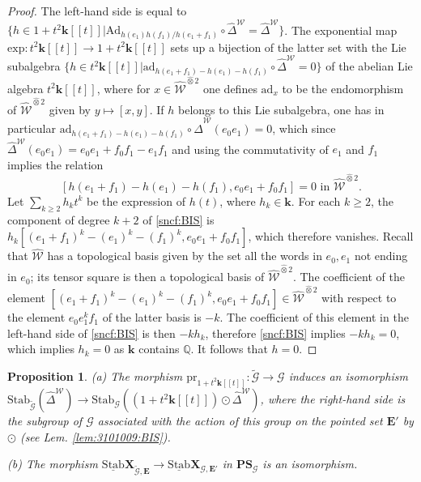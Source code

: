 \documentclass[10pt]{amsart}
\newtheorem{prop}[thm]{Proposition}
\numberwithin{equation}{subsection}
\begin{document}
\begin{proof} The left-hand side is equal to 
$\{h\in 1+t^2\mathbf k[[t]] | \mathrm{Ad}_{h(e_1)h(f_1)/h(e_1+f_1)} \circ\hat\Delta^{\mathcal W}
=\hat\Delta^{\mathcal W}\}$. The exponential map $\mathrm{exp} : t^2\mathbf k[[t]]\to 1+t^2\mathbf k[[t]]$ sets up a bijection of the latter set with the Lie subalgebra 
$\{h\in t^2\mathbf k[[t]] | \mathrm{ad}_{h(e_1+f_1)-h(e_1)-h(f_1)} \circ\hat\Delta^{\mathcal W}=0\}$ of the abelian Lie algebra $t^2\mathbf k[[t]]$, where for $x\in
\hat{\mathcal W}^{\hat\otimes2}$ one defines $\mathrm{ad}_x$ to be the endomorphism of $\hat{\mathcal W}^{\hat\otimes2}$ given by $y\mapsto [x,y]$. 
If $h$ belongs to this Lie subalgebra, one has in particular  $\mathrm{ad}_{h(e_1+f_1)-h(e_1)-h(f_1)} \circ\hat\Delta^{\mathcal W}(e_0e_1)=0$, which since 
$\hat\Delta^{\mathcal W}(e_0e_1)=e_0e_1+f_0f_1-e_1f_1$ and using the commutativity of $e_1$ and $f_1$ implies the relation 
\begin{equation}\label{sncf:BIS}
[h(e_1+f_1)-h(e_1)-h(f_1),e_0e_1+f_0f_1]=0\text{ in }\hat{\mathcal W}^{\hat\otimes 2}.
\end{equation} Let $\sum_{k\geq 2}h_kt^k$ be the expression of $h(t)$, where $h_k\in\mathbf k$. 
For each $k\geq2$, the component of degree $k+2$ of \eqref{sncf:BIS} is $h_k[(e_1+f_1)^k-(e_1)^k-(f_1)^k,e_0e_1+f_0f_1]$, which therefore vanishes. 
Recall that $\hat{\mathcal W}$ has a topological basis given by the set all the words in $e_0,e_1$ not ending in $e_0$; its tensor square is then a topological 
basis of $\hat{\mathcal W}^{\hat\otimes 2}$. The coefficient of the element $[(e_1+f_1)^k-(e_1)^k-(f_1)^k,e_0e_1+f_0f_1]\in 
\hat{\mathcal W}^{\hat\otimes 2}$ with respect to the element $e_0e_1^kf_1$ of the latter basis 
is $-k$. The coefficient of this element in the left-hand side of \eqref{sncf:BIS} is then $-kh_k$, therefore \eqref{sncf:BIS} implies $-kh_k=0$, which  
implies $h_k=0$ as $\mathbf k$ contains $\mathbb Q$. It follows that $h=0$.    
\end{proof}


\begin{prop}\label{prop:4:25:1110}
(a) The morphism  $\mathrm{pr}_{1+t^2\mathbf k[[t]]} : {\tilde{\mathcal G}}\to\mathcal G$ induces an isomorphism 
$ \mathrm{Stab}_{\tilde{\mathcal G}}(\hat\Delta^{\mathcal W})\to
\mathrm{Stab}_{\mathcal G}((1+t^2\mathbf k[[t]])\odot \hat\Delta^{\mathcal W})$, where the right-hand side is the subgroup of $\mathcal G$ 
associated with the action of this group on the pointed set $\mathbf E'$ by $\odot$ (see Lem. \ref{lem:3101009:BIS}). 

(b) The morphism $\underline{\mathrm{Stab}}\mathbf X_{{\tilde{\mathcal G}},\mathbf E}\to
\underline{\mathrm{Stab}}\mathbf X_{\mathcal G,\mathbf E'}$ in 
$\mathbf{PS}_{\mathcal G}$ is an isomorphism. 
\end{prop}
\end{document}
